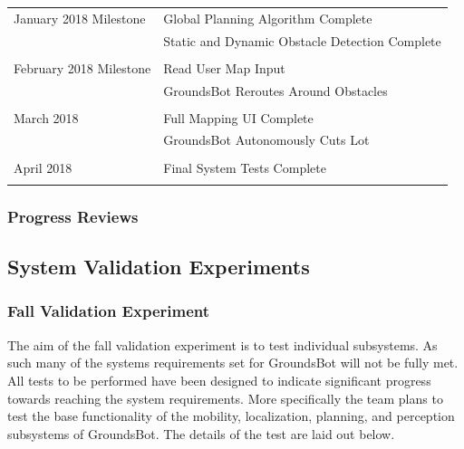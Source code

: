 \documentclass{article}
\begin{document}
\begin{table}[H]
\begin{tabular}{ll}
January 2018 Milestone 

    &Global Planning Algorithm Complete          \\
    &Static and Dynamic Obstacle Detection Complete\\
                                               \\
February 2018 Milestone 
  
    &Read User Map Input                        \\
    &GroundsBot Reroutes Around Obstacles       \\
                                              \\
March 2018 
  
    &Full Mapping UI Complete                   \\
    &GroundsBot Autonomously Cuts Lot           \\
                                              \\
April 2018 

    &Final System Tests Complete                \\                                            \\
\end{tabular}

\end{table}

\subsubsection{Progress Reviews}

\subsection{System Validation Experiments}
\subsubsection{Fall Validation Experiment}

	The aim of the fall validation experiment is to test individual subsystems. As such many of the systems requirements set for GroundsBot will not be fully met. All tests to be performed have been designed to indicate significant progress towards reaching the system requirements. More specifically the team plans to test the base functionality of the mobility, localization, planning, and perception subsystems of GroundsBot. The details of the test are laid out below.
		
\end{document}
